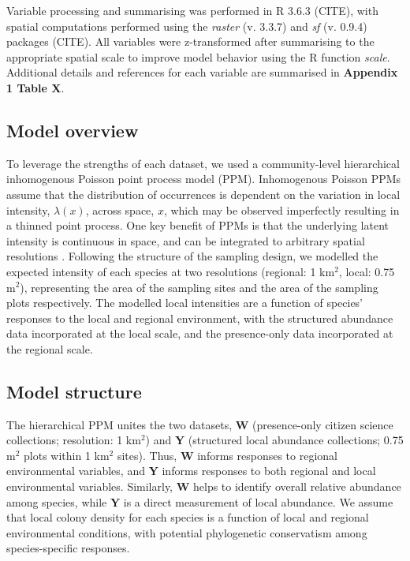 \documentclass[preprint,review,times,12pt]{elsarticle}
\begin{document}
Variable processing and summarising was performed in R 3.6.3 (CITE), with spatial computations performed using the \emph{raster} (v. 3.3.7) and \emph{sf} (v. 0.9.4) packages (CITE). All variables were z-transformed after summarising to the appropriate spatial scale to improve model behavior using the R function \emph{scale}. Additional details and references for each variable are summarised in \textbf{Appendix 1 Table X}.


\subsection{Model overview}
To leverage the strengths of each dataset, we used a community-level hierarchical inhomogenous Poisson point process model (PPM). Inhomogenous Poisson PPMs assume that the distribution of occurrences is dependent on the variation in local intensity, $\lambda(x)$, across space, $x$, which may be observed imperfectly resulting in a thinned point process. One key benefit of PPMs is that the underlying latent intensity is continuous in space, and can be integrated to arbitrary spatial resolutions \citep{Baddeley2015,Hefley2016}. Following the structure of the sampling design, we modelled the expected intensity of each species at two resolutions (regional: 1 km$^2$, local: 0.75 m$^2$), representing the area of the sampling sites and the area of the sampling plots respectively. The modelled local intensities are a function of species' responses to the local and regional environment, with the structured abundance data incorporated at the local scale, and the presence-only data incorporated at the regional scale. 


\subsection{Model structure}
The hierarchical PPM unites the two datasets, \textbf{W} (presence-only citizen science collections; resolution: 1 km$^2$) and \textbf{Y} (structured local abundance collections; 0.75 m$^2$ plots within 1 km$^2$ sites). Thus, \textbf{W} informs responses to regional environmental variables, and  \textbf{Y} informs responses to both regional and local environmental variables. Similarly, \textbf{W} helps to identify overall relative abundance among species, while \textbf{Y} is a direct measurement of local abundance. We assume that local colony density for each species is a function of local and regional environmental conditions, with potential phylogenetic conservatism among species-specific responses.
\end{document}
